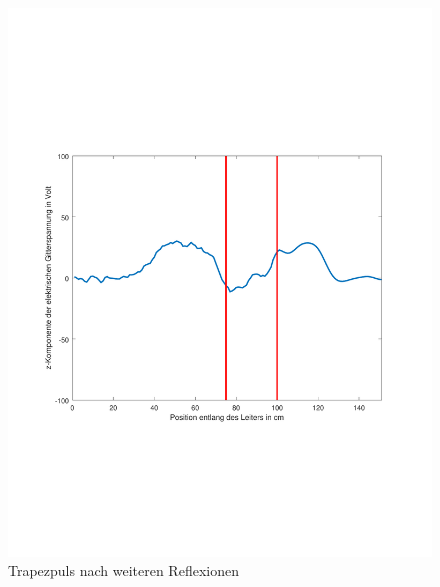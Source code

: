 \documentclass[Protokollheft.tex]{subfiles}
\begin{document}
\begin{figure}[ht]
	\centering
	\includegraphics[trim = 15mm 65mm 20mm 65mm, clip,width=0.7\linewidth]{untitledT3.pdf}
	\caption{Trapezpuls nach weiteren Reflexionen}\label{fig:inh3}
\end{figure} 
\end{document}
